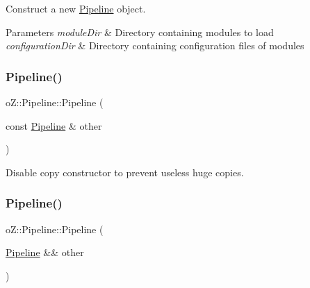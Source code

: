 Construct a new \mbox{\hyperlink{classo_z_1_1_pipeline}{Pipeline}} object. 


\begin{DoxyParams}{Parameters}
{\em module\+Dir} & Directory containing modules to load \\
\hline
{\em configuration\+Dir} & Directory containing configuration files of modules \\
\hline
\end{DoxyParams}
\mbox{\label{classo_z_1_1_pipeline_ab1d6cd9a6b71cae2b5ebe0031b945237}} 
\subsubsection{\texorpdfstring{Pipeline()}{Pipeline()}\hspace{0.1cm}{\footnotesize\ttfamily [2/3]}}
{\footnotesize\ttfamily o\+Z\+::\+Pipeline\+::\+Pipeline (\begin{DoxyParamCaption}\item[{const \mbox{\hyperlink{classo_z_1_1_pipeline}{Pipeline}} \&}]{other }\end{DoxyParamCaption})\hspace{0.3cm}{\ttfamily [delete]}}



Disable copy constructor to prevent useless huge copies. 

\mbox{\label{classo_z_1_1_pipeline_a6f9e61063bafb53108f1058f3de8c56a}} 
\subsubsection{\texorpdfstring{Pipeline()}{Pipeline()}\hspace{0.1cm}{\footnotesize\ttfamily [3/3]}}
{\footnotesize\ttfamily o\+Z\+::\+Pipeline\+::\+Pipeline (\begin{DoxyParamCaption}\item[{\mbox{\hyperlink{classo_z_1_1_pipeline}{Pipeline}} \&\&}]{other }\end{DoxyParamCaption})\hspace{0.3cm}{\ttfamily [default]}}



